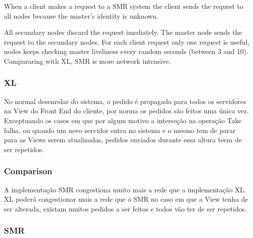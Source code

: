 \documentclass[times, 10pt,twocolumn]{article}
\begin{document}

When a client makes a request to a SMR system the client sends the request to all nodes because the master's identity is unknown.

All secundary nodes discard the request imediately. The master node
sends the request to the secundary nodes. For each client request only one request is useful, nodes keeps checking master liveliness every random seconds (between 3 and 10). Compararing with XL, SMR is more network intensive.

\subsubsection{XL}

No normal desenrolar do sistema, o pedido é propagado para todos os servidores na View do Front End do cliente, por norma os pedidos são feitos
uma única vez. Exceptuando os casos em que por algum motivo a interseção na operação Take falha, ou quando um novo servidor entra no sistema e 
o mesmo tem de parar para as Views serem atualizadas, pedidos enviados durante essa altura teem de ser repetidos.



\subsubsection{Comparison}

A implementação SMR congestiona muito mais a rede que a implementação XL. XL poderá congestionar mais a rede que o SMR no caso em que
a View tenha de ser alterada, existam muitos pedidos a ser feitos e todos vão ter de ser repetidos. 



\subsubsection{SMR}

\end{document}
